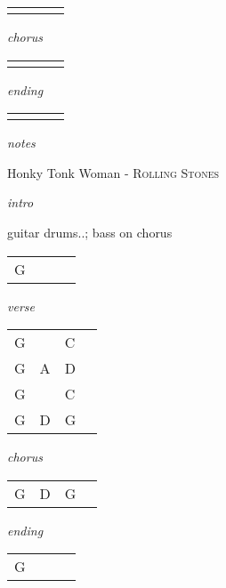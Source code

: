\documentclass[12pt]{article}
\begin{document}
\begin{tabular}{|P{1.25in}|P{1.25in}|P{1.25in}|P{1.25in}|}
    &   &   &   \\
\end{tabular}

\textit{chorus}

\begin{tabular}{|P{1.25in}|P{1.25in}|P{1.25in}|P{1.25in}|}
    &   &   &   \\
\end{tabular}

\textit{ending}

\begin{tabular}{|P{1.25in}|P{1.25in}|P{1.25in}|P{1.25in}|}
    &   &   &   \\
\end{tabular}

\textit{notes}

\newpage

{\Huge Honky Tonk Woman} {\huge - \textsc{Rolling Stones}}

\huge
\textit{intro}

guitar drums..; bass on chorus

\begin{tabular}{|P{1.25in}|P{1.25in}|P{1.25in}|P{1.25in}|}
  G &   &   &   \\
\end{tabular}

\textit{verse}

\begin{tabular}{|P{1.25in}|P{1.25in}|P{1.25in}|P{1.25in}|}
  G &   & C  &   \\
  G & A  &  D &   \\
  G &   & C  &   \\
  G & D & G  &   \\
\end{tabular}

\textit{chorus}

\begin{tabular}{|P{1.25in}|P{1.25in}|P{1.25in}|P{1.25in}|}
  G &  D & G  &   \\
\end{tabular}

\textit{ending}

\begin{tabular}{|P{1.25in}|P{1.25in}|P{1.25in}|P{1.25in}|}
  G &   &   &   \\
\end{tabular}
\end{document}
